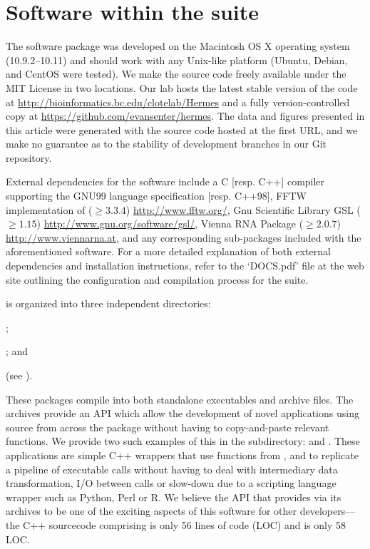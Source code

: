 \section{Software within the \hermes suite}
\label{sec:hermes:layout}
The \hermes software package was developed on the Macintosh OS X
operating system (10.9.2--10.11) and should work with any Unix-like platform
(Ubuntu, Debian, and CentOS were tested). We make the source code freely
available under the MIT License in two locations.
Our lab hosts the latest stable version of the code at
\url{http://bioinformatics.bc.edu/clotelab/Hermes} and a fully
version-controlled copy at \url{https://github.com/evansenter/hermes}.
The data and figures presented in this article were generated with the
source code hosted at the first URL, and we make no guarantee as to
the stability of development branches in our Git repository.

External dependencies for the software include a C [resp. C++]
compiler supporting the GNU99 language specification [resp. C++98],
FFTW implementation of \fft \citep{fftw05} ($\geq
3.3.4$) \url{http://www.fftw.org/}, Gnu Scientific Library GSL ($\geq
1.15$) \url{http://www.gnu.org/software/gsl/}, Vienna RNA Package
\citep{lorenz.amb11} ($\geq 2.0.7$) \url{http://www.viennarna.at}, and
any corresponding sub-packages included with the aforementioned
software. For a more detailed explanation of both external
dependencies and installation instructions, refer to the
`DOCS.pdf' file at the web site
outlining the configuration and compilation process for the \hermes
suite.

\hermes is organized into three independent directories:
\begin{inparaenum}[\em 1\upshape)]
\item \ffttwo; \item \rnamfpt; and \item \rnaeq (see
).
\end{inparaenum}
These packages compile into both
standalone executables and archive files. The archives provide an
API which allow the development of novel applications using source
from across the \hermes package without having to copy-and-paste
relevant functions. We provide two such examples of this in the
 subdirectory: \fftmfpt and \ffteq. These applications
are simple C++ wrappers that use functions from \ffttwo, \rnamfpt and
\rnaeq to replicate a pipeline of executable calls without having to
deal with intermediary data transformation, I/O between calls or
slow-down due to a scripting language wrapper such as Python, Perl or R.
We believe
the API that \hermes provides via its archives to be one of the exciting
aspects of this software for other developers---the C++ sourcecode comprising
\fftmfpt is only 56 lines of code (LOC) and \ffteq is only 58 LOC.


